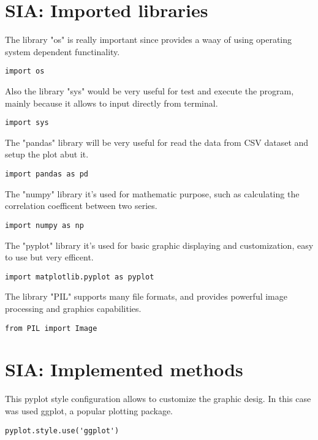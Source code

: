 


\label{SIA_Implementation}

\section{SIA: Imported libraries}
\label{SIA_libraries}
The library "os" is really important since provides a waay of using operating system dependent functinality.
\begin{lstlisting}
import os
\end{lstlisting}

Also the library "sys" would be very useful for test and execute the program, mainly because it allows to input directly from terminal.
\begin{lstlisting}
import sys
\end{lstlisting}

The "pandas" library will be very useful for read the data from CSV dataset and setup the plot abut it.
\begin{lstlisting}
import pandas as pd
\end{lstlisting}

The "numpy" library it's used for mathematic purpose, such as calculating the correlation coefficent between two series.
\begin{lstlisting}
import numpy as np
\end{lstlisting}
 
The "pyplot" library it's used for basic graphic displaying and customization, easy to use but very efficent.
\begin{lstlisting}
import matplotlib.pyplot as pyplot
\end{lstlisting}

The library "PIL" supports many file formats, and provides powerful image processing and graphics capabilities.
\begin{lstlisting}
from PIL import Image
\end{lstlisting}

\section{SIA: Implemented methods}
This pyplot style configuration allows to customize the graphic desig. In this case was used ggplot, a popular plotting package.
\begin{lstlisting}
pyplot.style.use('ggplot')
\end{lstlisting}

